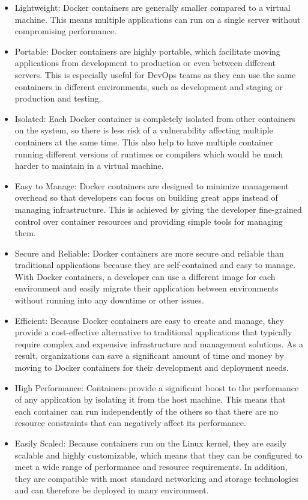 \documentclass[BIF,Master,nenglish]{twbook}%
\begin{document}
\begin{itemize}
\item Lightweight: Docker containers are generally smaller compared to a virtual machine. This means multiple applications can run on a single server without compromising performance.\cite{vmwcovsvm}

\item Portable: Docker containers are highly portable, which facilitate moving applications from development to production or even between different servers.\cite{rad2017} This is especially useful for DevOps teams as they can use the same containers in different environments, such as development and staging or production and testing.

\item Isolated: Each Docker container is completely isolated from other containers on the system, so there is less risk of a vulnerability affecting multiple containers at the same time.\cite{com2016} This also help to have multiple container running different versions of runtimes or compilers which would be much harder to maintain in a virtual machine.

\item Easy to Manage: Docker containers are designed to minimize management overhead so that developers can focus on building great apps instead of managing infrastructure. This is achieved by giving the developer fine-grained control over container resources and providing simple tools for managing them. 

\item Secure and Reliable: Docker containers are more secure and reliable than traditional applications because they are self-contained and easy to manage. With Docker containers, a developer can use a different image for each environment and easily migrate their application between environments without running into any downtime or other issues. 

\item Efficient: Because Docker containers are easy to create and manage, they provide a cost-effective alternative to traditional applications that typically require complex and expensive infrastructure and management solutions. As a result, organizations can save a significant amount of time and money by moving to Docker containers for their development and deployment needs. 

\item High Performance: Containers provide a significant boost to the performance of any application by isolating it from the host machine. This means that each container can run independently of the others so that there are no resource constraints that can negatively affect its performance.\cite{rad2017}

\item Easily Scaled: Because containers run on the Linux kernel, they are easily scalable and highly customizable, which means that they can be configured to meet a wide range of performance and resource requirements.\cite{rad2017} In addition, they are compatible with most standard networking and storage technologies and can therefore be deployed in many environment. 
\end{itemize}
\end{document}
